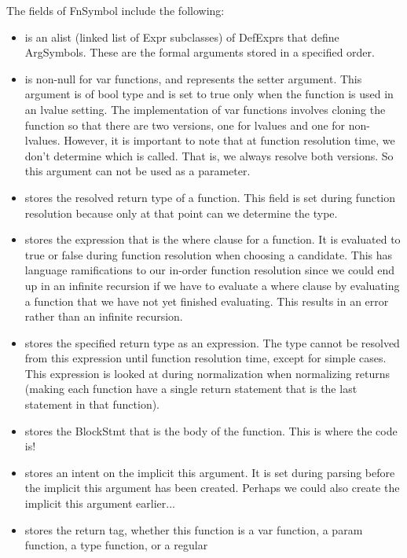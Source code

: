 \documentclass[10pt]{article}
\begin{document}
The fields of FnSymbol include the following:
\begin{itemize}
\item {} is an alist (linked list of Expr subclasses)
  of DefExprs that define ArgSymbols.  These are the formal arguments
  stored in a specified order.
\item {} is non-null for var functions, and
  represents the setter argument.  This argument is of bool type and
  is set to true only when the function is used in an lvalue setting.
  The implementation of var functions involves cloning the function so
  that there are two versions, one for lvalues and one for
  non-lvalues.  However, it is important to note that at function
  resolution time, we don't determine which is called.  That is, we
  always resolve both versions.  So this argument can not be used as a
  parameter.
\item {} stores the resolved return type of a
  function.  This field is set during function resolution because only
  at that point can we determine the type.
\item {} stores the expression that is the where
  clause for a function.  It is evaluated to true or false during
  function resolution when choosing a candidate.  This has language
  ramifications to our in-order function resolution since we could end
  up in an infinite recursion if we have to evaluate a where clause by
  evaluating a function that we have not yet finished evaluating.
  This results in an error rather than an infinite recursion.
\item {} stores the specified return type as
  an expression.  The type cannot be resolved from this expression
  until function resolution time, except for simple cases.  This
  expression is looked at during normalization when normalizing
  returns (making each function have a single return statement that is
  the last statement in that function).
\item {} stores the BlockStmt that is the body of
  the function.  This is where the code is!
\item {} stores an intent on the implicit this
  argument.  It is set during parsing before the implicit this
  argument has been created.  Perhaps we could also create the
  implicit this argument earlier...
\item {} stores the return tag, whether this function
  is a var function, a param function, a type function, or a regular

\end{itemize}
\end{document}
